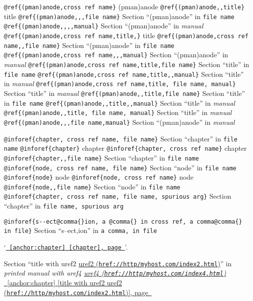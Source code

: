 \documentclass{book}
\begin{document}
\texttt{@ref\{(pman)anode,cross ref name\}} (pman)anode
\texttt{@ref\{(pman)anode{,}{,}title\}} title
\texttt{@ref\{(pman)anode{,}{,},file name\}} Section ``(pman)anode'' in \texttt{file name}
\texttt{@ref\{(pman)anode{,}{,}{,}{,}manual\}} Section ``(pman)anode'' in \textsl{manual}
\texttt{@ref\{(pman)anode,cross ref name,title,\}} title
\texttt{@ref\{(pman)anode,cross ref name{,}{,}file name\}} Section ``(pman)anode'' in \texttt{file name}
\texttt{@ref\{(pman)anode,cross ref name{,}{,},manual\}} Section ``(pman)anode'' in \textsl{manual}
\texttt{@ref\{(pman)anode,cross ref name,title,file name\}} Section ``title'' in \texttt{file name}
\texttt{@ref\{(pman)anode,cross ref name,title{,}{,}manual\}} Section ``title'' in \textsl{manual}
\texttt{@ref\{(pman)anode,cross ref name,title,\ file name,\ manual\}} Section ``title'' in \textsl{manual}
\texttt{@ref\{(pman)anode{,}{,}title,file name\}} Section ``title'' in \texttt{file name}
\texttt{@ref\{(pman)anode{,}{,}title{,}{,}manual\}} Section ``title'' in \textsl{manual}
\texttt{@ref\{(pman)anode{,}{,}title,\ file name,\ manual\}} Section ``title'' in \textsl{manual}
\texttt{@ref\{(pman)anode{,}{,},file name,manual\}} Section ``(pman)anode'' in \textsl{manual}


\texttt{@inforef\{chapter,\ cross ref name,\ file name\}} Section ``chapter'' in \texttt{file name}
\texttt{@inforef\{chapter\}} chapter
\texttt{@inforef\{chapter,\ cross ref name\}} chapter
\texttt{@inforef\{chapter{,}{,}file name\}} Section ``chapter'' in \texttt{file name}
\texttt{@inforef\{node,\ cross ref name,\ file name\}} Section ``node'' in \texttt{file name}
\texttt{@inforef\{node\}} node
\texttt{@inforef\{node,\ cross ref name\}} node
\texttt{@inforef\{node{,}{,}file name\}} Section ``node'' in \texttt{file name}
\texttt{@inforef\{chapter,\ cross ref name,\ file name,\ spurious arg\}} Section ``chapter'' in \texttt{file name,\ spurious arg}

\texttt{@inforef\{s{-}{-}ect@comma\{\}ion,\ a @comma\{\} in cross
ref,\ a comma@comma\{\} in file\}}
Section ``s--ect,ion'' in \texttt{a comma, in file}

`\texttt{\hyperref[anchor:chapter]{\chaptername~\ref*{anchor:chapter} [chapter], page~\pageref*{anchor:chapter}}}'.

Section ``title with uref2 \href{href://http/myhost.com/index2.html}{uref2 (\nolinkurl{href://http/myhost.com/index2.html})}'' in \textsl{printed manual with uref4 \href{href://http/myhost.com/index4.html}{uref4 (\nolinkurl{href://http/myhost.com/index4.html})}}
\hyperref[anchor:chapter]{\chaptername~\ref*{anchor:chapter} [title with uref2 \href{href://http/myhost.com/index2.html}{uref2 (\nolinkurl{href://http/myhost.com/index2.html})}], page~\pageref*{anchor:chapter}}
\end{document}
